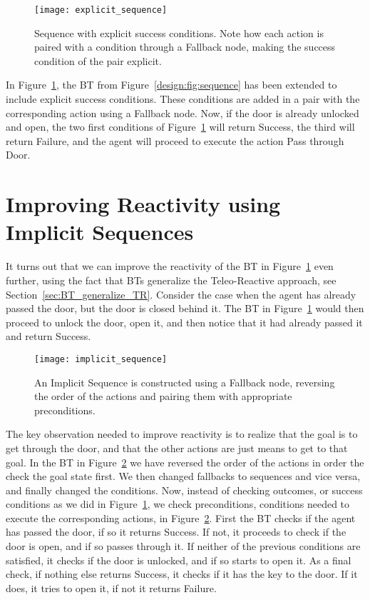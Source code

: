 \begin{figure}[h]
\centering
\texttt{[image: explicit\_sequence]}
\caption{Sequence with explicit success conditions. Note how each action is paired with a condition through a Fallback node, making the success condition of the pair explicit.}
\label{design:fig:explicit_sequence}
\end{figure}

In Figure~\ref{design:fig:explicit_sequence}, the BT from Figure~\ref{design:fig:sequence} has been extended to include explicit success conditions. These conditions are added in a pair with the corresponding action using a Fallback node. Now, if the door is already unlocked and open, the two first conditions of Figure~\ref{design:fig:explicit_sequence}
will return Success, the third will return Failure, and the agent will proceed to execute the action Pass through Door.


\section{Improving Reactivity using Implicit Sequences}
\label{sec:implicit_sequences}

It turns out that we can  improve the reactivity of the BT in Figure~\ref{design:fig:explicit_sequence} even further,
using the fact that BTs generalize the Teleo-Reactive approach, see Section~\ref{sec:BT_generalize_TR}.
Consider the case when the agent has already passed the door, but the door is closed behind it. The BT in Figure~\ref{design:fig:explicit_sequence}
would then proceed to unlock the door, open it, and then notice that it had already passed it and return Success.

\begin{figure}[h]
\centering
\texttt{[image: implicit\_sequence]}
\caption{An Implicit Sequence is constructed using a Fallback node, reversing the order of the actions and pairing them with appropriate preconditions.}
\label{design:fig:implicit_sequence}
\end{figure}

The key observation needed to improve reactivity is to realize that the goal is to get through the door, and that the other actions are just means to get to
that goal. In the BT in Figure~\ref{design:fig:implicit_sequence} we have reversed the order of the actions in order the check the goal state first.
We then changed fallbacks to sequences and vice versa, and finally changed the conditions. Now, instead of checking outcomes, or success conditions as we did in 
Figure~\ref{design:fig:explicit_sequence}, we check preconditions, conditions needed to execute the corresponding actions, in Figure~\ref{design:fig:implicit_sequence}.
First the BT checks if the agent has passed the door, if so it returns Success. If not, it proceeds to check if the door is open, and if so passes through it. If neither of the previous conditions are satisfied, it checks if the door is unlocked, and if so starts to open it. As a final check, if nothing else returns Success, it checks if it has the key to the door. If it does, it tries to open it, if not it returns Failure.



